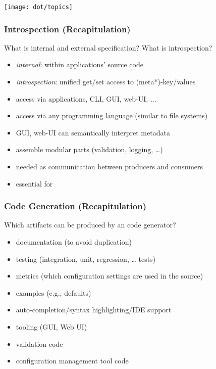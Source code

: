 \begin{frame}
	\hspace*{-1cm}\texttt{[image: dot/topics]}
\end{frame}

\begin{frame}
	\frametitle{Introspection (Recapitulation)}
	\begin{task}
	What is internal and external specification?
	What is introspection?
	\end{task}

	\pause
	\vspace{1em}

	\begin{itemize}
	\item \textit{internal}: within applications' source code
	\item \textit{introspection}: unified get/set access to (meta*)-key/values
	\item access via applications, CLI, GUI, web-UI, ...
	\item access via any programming language (similar to file systems)
	\item GUI, web-UI can semantically interpret metadata
	\item assemble modular parts (validation, logging, \dots)
	\item needed as communication between producers and consumers
	\item essential for ~\citet{holland2001nofutz}
	\end{itemize}
\end{frame}

\begin{frame}
	\frametitle{Code Generation (Recapitulation)}
	\begin{task}
	Which artifacts can be produced by an code generator?
	\end{task}

	\pause

	\begin{itemize}
	\item documentation (to avoid duplication)
	\item testing (integration, unit, regression, \dots{} tests)
	\item metrics (which configuration settings are used in the source)
	\item examples (e.g., defaults)
	\item auto-completion/syntax highlighting/IDE support
	\item tooling (GUI, Web UI)
	\item validation code
	\item configuration management tool code
	\end{itemize}
\end{frame}

